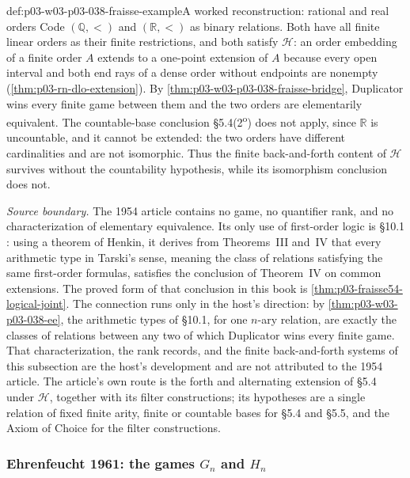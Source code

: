 \begin{hbexample}{def:p03-w03-p03-038-fraisse-example}{A worked reconstruction: rational and real orders}
Code \((\mathbb Q,<)\) and \((\mathbb R,<)\) as binary relations. Both
have all finite linear orders as their finite restrictions, and both
satisfy \(\mathcal H\): an order embedding of a finite order \(A\) extends
to a one-point extension of \(A\) because every open interval and both end
rays of a dense order without endpoints are nonempty
(\cref{thm:p03-rn-dlo-extension}). By
\cref{thm:p03-w03-p03-038-fraisse-bridge}, Duplicator wins every finite
game between them and the two orders are elementarily equivalent. The
countable-base conclusion \S5.4(2\textsuperscript{o}) does not apply,
since \(\mathbb R\) is uncountable, and it cannot be extended: the two
orders have different cardinalities and are not isomorphic. Thus the
finite back-and-forth content of \(\mathcal H\) survives without the
countability hypothesis, while its isomorphism conclusion does not.
\end{hbexample}

\emph{Source boundary.} The 1954 article contains no game, no quantifier
rank, and no characterization of elementary equivalence. Its only use of
first-order logic is \S10.1 \cite[p.~388]{Fraisse1954}: using a theorem of
Henkin, it derives from Theorems~III and~IV that every arithmetic type in
Tarski's sense, meaning the class of relations satisfying the same
first-order formulas, satisfies the conclusion of Theorem~IV on common
extensions. The proved form of that conclusion in this book is
\cref{thm:p03-fraisse54-logical-joint}. The connection runs only in the
host's direction: by \cref{thm:p03-w03-p03-038-ee}, the arithmetic types of
\S10.1, for one \(n\)-ary relation, are exactly the classes of relations
between any two of which Duplicator wins every finite game. That
characterization, the rank records, and the finite back-and-forth systems
of this subsection are the host's development and are not attributed to
the 1954 article. The article's own route is the forth and alternating
extension of \S5.4 under \(\mathcal H\), together with its filter
constructions; its hypotheses are a single relation of fixed finite arity,
finite or countable bases for \S5.4 and \S5.5, and the Axiom of Choice for
the filter constructions.

\subsubsection{Ehrenfeucht 1961: the games \(G_n\) and \(H_n\)}
\label{sec:p03-w03-p03-038-ehrenfeucht}

